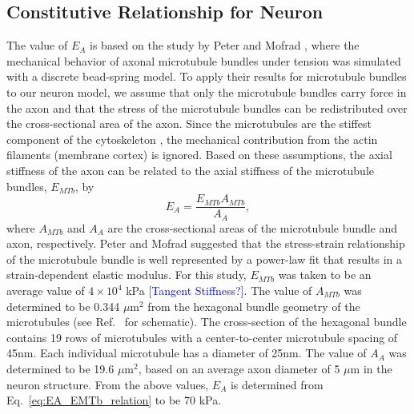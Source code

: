 \documentclass[]{interact}
\newcommand{\blue}[1]{\textcolor{blue}{[#1]}}
\begin{document}
\subsection{Constitutive Relationship for Neuron}

The value of $E_A$ is based on the study by Peter and Mofrad \citep{Peter:2012fc}, where the mechanical behavior of axonal microtubule bundles under tension was simulated with a discrete bead-spring model. To apply their results for microtubule bundles to our neuron model, we assume that only the microtubule bundles carry force in the axon and that the stress of the microtubule bundles can be redistributed over the cross-sectional area of the axon. Since the microtubules are the stiffest component of the cytoskeleton \citep{Fletcher:2010ku}, the mechanical contribution from the actin filaments (membrane cortex) is ignored. Based on these assumptions, the axial stiffness of the axon can be related to the axial stiffness of the microtubule bundles, $E_{MTb}$, by
%
\begin{equation}
E_A = \frac{E_{MTb} A_{MTb}}{A_A},
\label{eq:EA_EMTb_relation}
\end{equation}
%
where $A_{MTb}$ and $A_A$ are the cross-sectional areas of the microtubule bundle and axon, respectively. Peter and Mofrad \citep{Peter:2012fc} suggested that the stress-strain relationship of the microtubule bundle is well represented by a power-law fit that results in a strain-dependent elastic modulus. For this study, $E_{MTb}$ was taken to be an average value of $4\times 10^{4}$ kPa \blue{Tangent Stiffness?}. The value of $A_{MTb}$ was determined to be 0.344 $\mu$m${}^2$ from the hexagonal bundle geometry of the microtubules (see Ref.\ \citep{Peter:2012fc} for schematic). The cross-section of the hexagonal bundle contains 19 rows of microtubules with a center-to-center microtubule spacing of 45nm. Each  individual microtubule has a diameter of 25nm. The value of $A_A$ was determined to be 19.6 $\mu$m${}^2$, based on an average axon diameter of 5 $\mu$m in the neuron structure. From the above values, $E_A$ is determined from Eq.\ \eqref{eq:EA_EMTb_relation} to be 70 kPa. 
\end{document}
